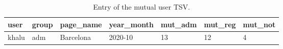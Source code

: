 \begin{table}[H]
    \centering
    \begin{tabularx}{\columnwidth}{@{}XXXXXXX@{}}
        \midrule
        \textbf{user} & \textbf{group} & \textbf{page\_name}& \textbf{year\_month} & \textbf{mut\_adm}& \textbf{mut\_reg}& \textbf{mut\_not}\\ \toprule
        khalu & adm & Barcelona & 2020-10 & 13 & 12 & 4 \\
        
         \bottomrule
    \end{tabularx}

    
    \caption{Entry of the mutual user TSV. \label{table:rjevks}}
\end{table}







